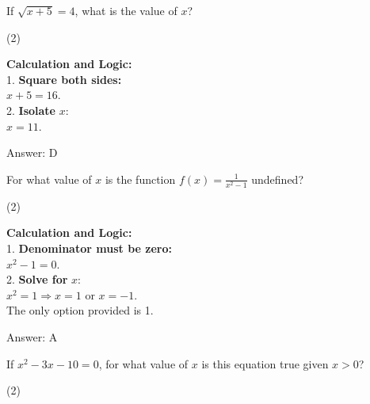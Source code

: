 \documentclass[11pt,paper=a4,answers]{exam}
\begin{document}
\begin{questions}
\question
If $\sqrt{x+5} = 4$, what is the value of $x$?
\begin{tasks}(2)
\end{tasks}

\begin{solution}
\textbf{Calculation and Logic:} \\
1. \textbf{Square both sides:} \\
$x + 5 = 16$. \\
2. \textbf{Isolate } $x$: \\
$x = 11$.

\vspace{30pt}

Answer: \colorbox{yellow!100}{D}
\end{solution}

\vspace{60pt}

\question
For what value of $x$ is the function $f(x) = \frac{1}{x^2 - 1}$ undefined?
\begin{tasks}(2)
\end{tasks}

\begin{solution}
\textbf{Calculation and Logic:} \\
1. \textbf{Denominator must be zero:} \\
$x^2 - 1 = 0$. \\
2. \textbf{Solve for } $x$: \\
$x^2 = 1 \Rightarrow x = 1$ or $x = -1$. \\
The only option provided is 1.

\vspace{30pt}

Answer: \colorbox{yellow!100}{A}
\end{solution}

\vspace{60pt}

\question
If $x^2 - 3x - 10 = 0$, for what value of $x$ is this equation true given $x > 0$?
\begin{tasks}(2)
\end{tasks}


\end{questions}
\end{document}
